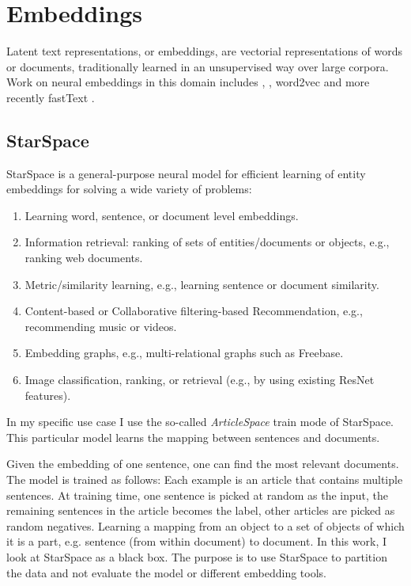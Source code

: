 \section{Embeddings}
\label{Embeddigns}
Latent text representations, or embeddings, are vectorial representations of words or documents, traditionally learned in an unsupervised way over large corpora. Work on neural embeddings in this domain includes \cite{Bengio2003}, 
\cite{Collobert2011}, word2vec \cite{goldberg2014word2vec} and more recently fastText \cite{joulin2016fasttext}.

\subsection{StarSpace}
\label{subsec:StarSpace}
StarSpace \cite{StarSpace} is a general-purpose neural model for efficient learning of entity embeddings for solving a wide variety of problems:

\begin{enumerate}
	\item Learning word, sentence, or document level embeddings.
	\item Information retrieval: ranking of sets of entities/documents or objects, e.g., ranking web documents.
	\item Metric/similarity learning, e.g., learning sentence or document similarity.
	\item Content-based or Collaborative filtering-based Recommendation, e.g., recommending music or videos.
	\item Embedding graphs, e.g., multi-relational graphs such as Freebase.
	\item Image classification, ranking, or retrieval (e.g., by using existing ResNet features).
\end{enumerate}

In my specific use case I use the so-called \emph{ArticleSpace} train mode of StarSpace. 
This particular model learns the mapping between sentences and documents.

Given the embedding of one sentence, one can find the most relevant documents. 
The model is trained as follows: Each example is an article that contains multiple sentences. At training time, one sentence is picked at random as the input, the remaining sentences in the article becomes the label, other articles are picked as random negatives.
Learning a mapping from an object to a set of objects of which it is a part, e.g. sentence (from within document) to document.
In this work, I look at StarSpace as a black box. The purpose is to use StarSpace to partition the data and not evaluate the model or different embedding tools.

